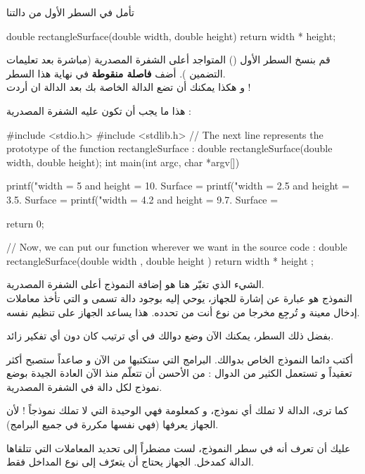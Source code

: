 تأمل في السطر الأول من دالتنا

\begin{Csource}
double rectangleSurface(double width, double height)
{
	return width * height;
}
\end{Csource}

قم بنسخ السطر الأول
()
المتواجد أعلى الشفرة المصدرية (مباشرة بعد تعليمات التضمين
). أضف
\textbf{فاصلة منقوطة}
في نهاية هذا السطر.\\
و هكذا يمكنك أن تضع الدالة الخاصة بك
بعد الدالة
ان أردت !

هذا ما يجب أن تكون عليه الشفرة المصدرية :

\begin{Csource}
#include <stdio.h>
#include <stdlib.h>
// The next line represents the prototype of the function rectangleSurface :
double rectangleSurface(double width, double height);
int main(int argc, char *argv[])
{
	printf("width = 5 and height = 10. Surface = %
	printf("width = 2.5 and height = 3.5. Surface = %
	printf("width = 4.2 and height = 9.7. Surface = %

	return 0;
}
// Now, we can put our function wherever we want in the source code :
double rectangleSurface(double width , double height )
{
	return width * height ;
}
\end{Csource}

الشيء الذي تغيّر هنا هو إضافة النموذج أعلى الشفرة المصدرية.\\
النموذج هو عبارة عن إشارة للجهاز، يوحي إليه بوجود دالة تسمى
و التي تأخذ معاملات إدخال معينة و تُرجِع مخرجا من نوع أنت من تحدده.  هذا يساعد الجهاز على تنظيم نفسه.

بفضل ذلك السطر، يمكنك الآن وضع دوالك في أي ترتيب كان دون أي تفكير زائد.

أكتب دائما النموذج الخاص بدوالك. البرامج التي ستكتبها من الآن و صاعداً ستصبح أكثر تعقيداً و تستعمل الكثير من الدوال : من الأحسن أن تتعلّم منذ الآن العادة الجيدة  بوضع نموذج لكل دالة في الشفرة المصدرية.

كما ترى، الدالة
لا تملك أي نموذج، و كمعلومة فهي الوحيدة التي لا تملك نموذجاً ! لأن الجهاز يعرفها (فهي نفسها مكررة في جميع البرامج).

عليك أن تعرف أنه في سطر النموذج، لست مضطراً إلى تحديد المعاملات التي تتلقاها الدالة كمدخل. الجهاز يحتاج أن يتعرّف إلى نوع المداخل فقط.

